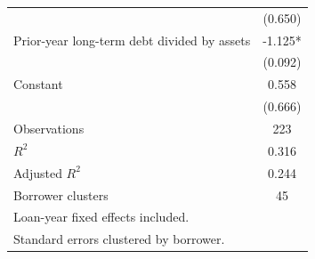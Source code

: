 {\begin{tabular}{l*{1}{c}}
                    &     (0.650)   \\
Prior-year long-term debt divided by assets&      -1.125*  \\
                    &     (0.092)   \\
Constant            &       0.558   \\
                    &     (0.666)   \\
\hline
Observations        &         223   \\
\(R^{2}\)           &       0.316   \\
Adjusted \(R^{2}\)  &       0.244   \\
Borrower clusters   &          45   \\
\hline\hline
\multicolumn{2}{l}{\footnotesize Loan-year fixed effects included.}\\
\multicolumn{2}{l}{\footnotesize Standard errors clustered by borrower.}\\
\end{tabular}
}
